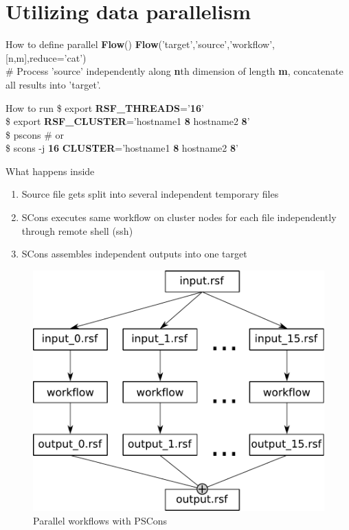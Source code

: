 \section{Utilizing data parallelism}

\begin{frame}
  \begin{block}{How to define parallel {\bf Flow}()}
    {\bf Flow}('target','source','workflow',[n,m],reduce='cat') \\
    \# Process 'source' independently along {\bf n}th dimension of length {\bf m},
    concatenate all results into 'target'.
  \end{block}
  \begin{block}{How to run}
    \$ export {\bf RSF\_THREADS}='{\bf 16}' \\
    \$ export {\bf RSF\_CLUSTER}='hostname1 {\bf 8} hostname2 {\bf 8}' \\
    \$ pscons \# or \\
    \$ scons -j {\bf 16} {\bf CLUSTER}='hostname1 {\bf 8} hostname2 {\bf 8}'
  \end{block}
  \begin{block}{What happens inside}
    \begin{enumerate}
      \item Source file gets split into several independent temporary files
      \item SCons executes same workflow on cluster nodes for each file
            independently through remote shell (ssh)
      \item SCons assembles independent outputs into one target
    \end{enumerate}
  \end{block}
\end{frame}

\begin{frame}
  \begin{figure}
  \includegraphics[scale=0.45]{Fig/pscons.pdf}
  \caption{Parallel workflows with PSCons}
  \end{figure}
\end{frame}

